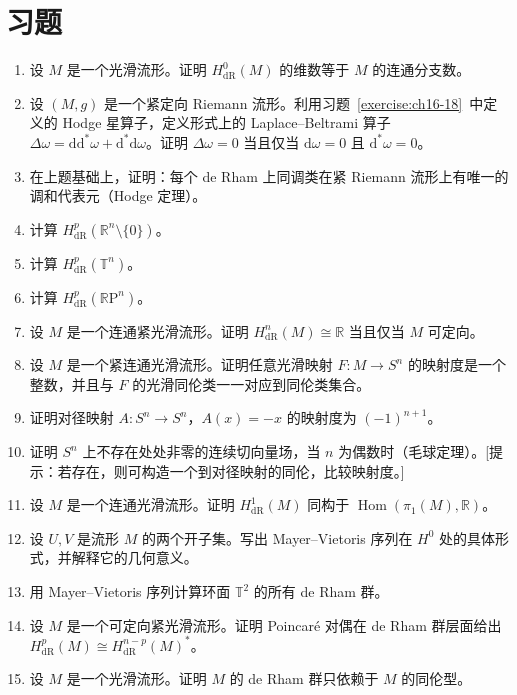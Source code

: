 \documentclass[../../main.tex]{subfiles}
\begin{document}
\section{习题}\label{section:ch17-problems}

\begin{enumerate}
\item\label{exercise:ch17-01} 设 $M$ 是一个光滑流形。证明 $H^0_{\mathrm{dR}}(M)$ 的维数等于 $M$ 的连通分支数。
\item\label{exercise:ch17-02} 设 $(M,g)$ 是一个紧定向 Riemann 流形。利用习题~\cref{exercise:ch16-18}~中定义的 Hodge 星算子，定义形式上的 Laplace--Beltrami 算子 $\Delta\omega=\mathrm{d}\mathrm{d}^*\omega+\mathrm{d}^*\mathrm{d}\omega$。证明 $\Delta\omega=0$ 当且仅当 $\mathrm{d}\omega=0$ 且 $\mathrm{d}^*\omega=0$。
\item\label{exercise:ch17-03} 在上题基础上，证明：每个 de Rham 上同调类在紧 Riemann 流形上有唯一的调和代表元（Hodge 定理）。
\item\label{exercise:ch17-04} 计算 $H^p_{\mathrm{dR}}(\mathbb{R}^n\setminus\{0\})$。
\item\label{exercise:ch17-05} 计算 $H^p_{\mathrm{dR}}(\mathbb{T}^n)$。
\item\label{exercise:ch17-06} 计算 $H^p_{\mathrm{dR}}(\mathbb{R}\mathrm{P}^n)$。
\item\label{exercise:ch17-07} 设 $M$ 是一个连通紧光滑流形。证明 $H^n_{\mathrm{dR}}(M)\cong\mathbb{R}$ 当且仅当 $M$ 可定向。
\item\label{exercise:ch17-08} 设 $M$ 是一个紧连通光滑流形。证明任意光滑映射 $F:M\to S^n$ 的映射度是一个整数，并且与 $F$ 的光滑同伦类一一对应到同伦类集合。
\item\label{exercise:ch17-09} 证明对径映射 $A:S^n\to S^n$，$A(x)=-x$ 的映射度为 $(-1)^{n+1}$。
\item\label{exercise:ch17-10} 证明 $S^n$ 上不存在处处非零的连续切向量场，当 $n$ 为偶数时（毛球定理）。[提示：若存在，则可构造一个到对径映射的同伦，比较映射度。]
\item\label{exercise:ch17-11} 设 $M$ 是一个连通光滑流形。证明 $H^1_{\mathrm{dR}}(M)$ 同构于 $\operatorname{Hom}(\pi_1(M),\mathbb{R})$。
\item\label{exercise:ch17-12} 设 $U,V$ 是流形 $M$ 的两个开子集。写出 Mayer--Vietoris 序列在 $H^0$ 处的具体形式，并解释它的几何意义。
\item\label{exercise:ch17-13} 用 Mayer--Vietoris 序列计算环面 $\mathbb{T}^2$ 的所有 de Rham 群。
\item\label{exercise:ch17-14} 设 $M$ 是一个可定向紧光滑流形。证明 Poincaré 对偶在 de Rham 群层面给出 $H^p_{\mathrm{dR}}(M)\cong H^{n-p}_{\mathrm{dR}}(M)^*$。
\item\label{exercise:ch17-15} 设 $M$ 是一个光滑流形。证明 $M$ 的 de Rham 群只依赖于 $M$ 的同伦型。
\end{enumerate}
\end{document}
